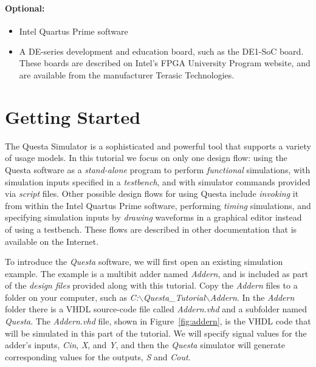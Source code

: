 \documentclass[11pt, twoside, pdftex]{article}
\begin{document}
{\bf Optional:}
\begin{itemize}
\item Intel Quartus\textsuperscript{\textregistered} Prime software
\item A DE-series development and education board, such as the DE1-SoC board. These boards are 
described on Intel's FPGA University Program website, and are available from the manufacturer 
Terasic Technologies.
\end{itemize}

\clearpage
\newpage
\section{Getting Started}

The Questa Simulator is a sophisticated and powerful tool that supports a variety of 
usage models. In this tutorial we focus on only one design flow: using the Questa
software as a {\it stand-alone} program to perform {\it functional} simulations, with 
simulation inputs specified in a {\it testbench}, and with simulator commands provided 
via {\it script} files. Other possible design flows for using Questa include {\it invoking}
it from within the Intel Quartus Prime software, performing {\it timing} simulations, and
specifying simulation inputs by {\it drawing} waveforms in a graphical editor instead of
using a testbench. These flows are described in other
documentation that is available on the Internet.  

\noindent
To introduce the {\it Questa} software, we will first open an existing simulation example.
The example is a multibit adder named {\it Addern}, and is included as 
part of the {\it design files} provided
along with this tutorial. Copy the {\it Addern} files to a folder on your computer, such
as {\it C:$\backslash$Questa\_Tutorial$\backslash$Addern}. In the {\it Addern} folder
there is a VHDL source-code file called {\it Addern.vhd} and a subfolder named {\it Questa}.
The {\it Addern.vhd} file, shown in Figure~\ref{fig:addern}, is the VHDL code that will 
be simulated in this part of the tutorial. We will specify signal 
values for the adder's inputs, {\it Cin}, {\it X}, and {\it Y}, and then the {\it
Questa} simulator will generate corresponding values for the outputs, {\it S} and {\it Cout}.
\end{document}
